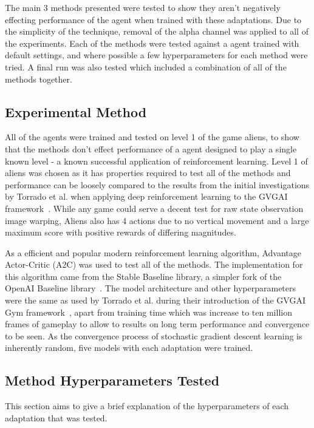 
The main 3 methods presented were tested to show they aren't negatively effecting performance of the agent when trained with these adaptations. 
Due to the simplicity of the technique, removal of the alpha channel was applied to all of the experiments.
Each of the methods were tested against a agent trained with default settings, and where possible a few hyperparameters for each method were tried.
A final run was also tested which included a combination of all of the methods together.

\subsection{Experimental Method}
\label{ssec:experimentalMethod}
All of the agents were trained and tested on level 1 of the game aliens, to show that the methods don't effect performance of a agent designed to play a single known level - a known successful application of reinforcement learning.
Level 1 of aliens was chosen as it has properties required to test all of the methods and performance can be loosely compared to the results from the initial investigations by Torrado et al. when applying deep reinforcement learning to the GVGAI framework~\cite{GVGAIGym}. 
While any game could serve a decent test for raw state observation image warping, Aliens also has 4 actions due to no vertical movement and a large maximum score with positive rewards of differing magnitudes.
\par
As a efficient and popular modern reinforcement learning algorithm, Advantage Actor-Critic (A2C) was used to test all of the methods.
The implementation for this algorithm came from the Stable Baseline library, a simpler fork of the OpenAI Baseline library~\cite{stable-baselines}.
The model architecture and other hyperparameters were the same as used by Torrado et al. during their introduction of the GVGAI Gym framework~\cite{GVGAIGym}, apart from training time which was increase to ten million frames of gameplay to allow to results on long term performance and convergence to be seen.
As the convergence process of stochastic gradient descent learning is inherently random, five models with each adaptation were trained.

\subsection{Method Hyperparameters Tested}
This section aims to give a brief explanation of the hyperparameters of each adaptation that was tested.
